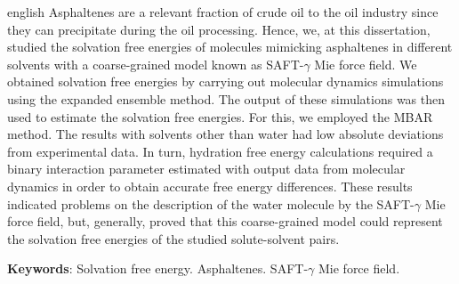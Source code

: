 \documentclass[
	12pt,				%
	openany,			%
	oneside,			%
	a4paper,			%
	english,			%
	brazil				%
	]{abntex2}
\begin{document}
\setlength{\absparsep}{18pt} %
%
\begin{resumo}[Abstract]
 \begin{otherlanguage*}{english}
   Asphaltenes are a  relevant fraction of crude oil to the oil industry since they can precipitate during the oil processing. Hence, we, at this dissertation, studied the solvation free energies of molecules mimicking asphaltenes in different solvents with a coarse-grained model known as SAFT-$\gamma$ Mie force field. We obtained solvation free energies  by carrying out molecular dynamics simulations using the expanded ensemble method. The output of these simulations was then used to estimate the solvation free energies. For this, we employed the MBAR method. The results with solvents other than water had low absolute deviations from experimental data. In turn, hydration free energy calculations required a binary interaction parameter estimated with output data from molecular dynamics in order to obtain accurate free energy differences. These results indicated problems on the description of the water molecule by the SAFT-$\gamma$ Mie force field, but, generally, proved that this coarse-grained model could represent the solvation free energies of the studied solute-solvent pairs.

   \vspace{\onelineskip}
 
   \noindent 
   \textbf{Keywords}: Solvation free energy. Asphaltenes. SAFT-$\gamma$ Mie force field.
 \end{otherlanguage*}
\end{resumo}

\listoffigures*
\cleardoublepage
\end{document}
